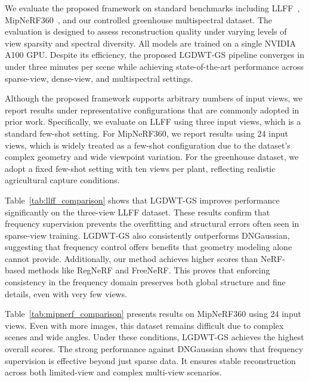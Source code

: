 We evaluate the proposed framework on standard benchmarks including LLFF~\cite{mildenhall2019llff}, MipNeRF360~\cite{barron2022mipnerf360}, and our controlled greenhouse multispectral dataset. The evaluation is designed to assess reconstruction quality under varying levels of view sparsity and spectral diversity. All models are trained on a single NVIDIA A100 GPU. Despite its efficiency, the proposed LGDWT-GS pipeline converges in under three minutes per scene while achieving state-of-the-art performance across sparse-view, dense-view, and multispectral settings.

Although the proposed framework supports arbitrary numbers of input views, we report results under representative configurations that are commonly adopted in prior work. Specifically, we evaluate on LLFF using three input views, which is a standard few-shot setting. For MipNeRF360, we report results using 24 input views, which is widely treated as a few-shot configuration due to the dataset’s complex geometry and wide viewpoint variation. For the greenhouse dataset, we adopt a fixed few-shot setting with ten views per plant, reflecting realistic agricultural capture conditions.

Table~\ref{tab:llff_comparison} shows that LGDWT-GS improves performance significantly on the three-view LLFF dataset. These results confirm that frequency supervision prevents the overfitting and structural errors often seen in sparse-view training. LGDWT-GS also consistently outperforms DNGaussian, suggesting that frequency control offers benefits that geometry modeling alone cannot provide. Additionally, our method achieves higher scores than NeRF-based methods like RegNeRF and FreeNeRF. This proves that enforcing consistency in the frequency domain preserves both global structure and fine details, even with very few views.

Table~\ref{tab:mipnerf_comparison} presents results on MipNeRF360 using 24 input views. Even with more images, this dataset remains difficult due to complex scenes and wide angles. Under these conditions, LGDWT-GS achieves the highest overall scores. The strong performance against DNGaussian shows that frequency supervision is effective beyond just sparse data. It ensures stable reconstruction across both limited-view and complex multi-view scenarios.


